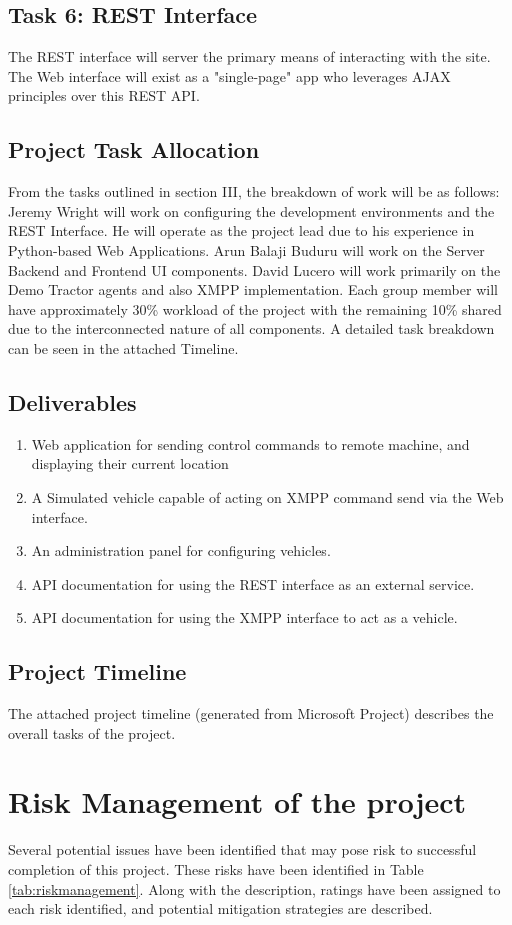 \documentclass[conference,12pt]{IEEEtran}
\begin{document}
\subsection{Task 6: REST Interface}
The REST interface will server the primary means of interacting with the site.
The Web interface will exist as a "single-page" app who leverages AJAX
principles over this REST API. 
\subsection{Project Task Allocation}

From the tasks outlined in section III, the breakdown of work will be as follows:
Jeremy Wright will work on configuring the development environments and the REST Interface.
He will operate as the project lead due to his experience in Python-based Web Applications.
Arun Balaji Buduru will work on the Server Backend and Frontend UI components.
David Lucero will work primarily on the Demo Tractor agents and also XMPP implementation.
Each group member will have approximately 30\% workload of the project with the remaining
10\% shared due to the interconnected nature of all components. A detailed task breakdown
can be seen in the attached Timeline.

\subsection{Deliverables}
\begin{enumerate}
\item Web application for sending control commands to remote machine, and
displaying their current location
\item A Simulated vehicle capable of acting on XMPP command send via the Web
interface.
\item An administration panel for configuring vehicles.
\item API documentation for using the REST interface as an external service.
\item API documentation for using the XMPP interface to act as a vehicle.
\end{enumerate}
\subsection{Project Timeline}
The attached project timeline (generated from Microsoft Project) describes the
overall tasks of the project.
\section{Risk Management of the project}
Several potential issues have been identified that may pose risk to successful
completion of this project. These risks have been identified in Table
\ref{tab:riskmanagement}. Along with the description, ratings have been assigned
to each risk identified, and potential mitigation strategies are described.
\end{document}
